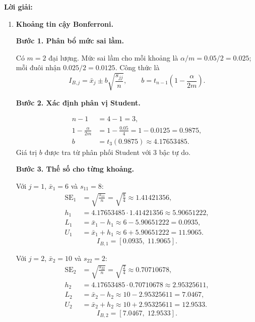\documentclass[11pt,a4paper]{article}
\newenvironment{solution}{%
  \par\medskip\noindent\textbf{Lời giải:}\par\nobreak\smallskip\noindent\ignorespaces
}{\par}
\newcommand{\answer}[1]{\boxed{#1}}
\newcommand{\step}[2]{\par\medskip\noindent\textbf{Bước #1. #2}\par\nopagebreak[4]\smallskip\noindent}
\begin{document}
\begin{solution}
\begin{enumerate}[label=\textbf{\alph*)}]
Các khoảng chiếu có mức bao phủ đồng thời ít nhất $95\%$ dưới giả thiết mẫu chuẩn.
\item \textbf{Khoảng tin cậy Bonferroni.}\par\nopagebreak[4]
\step{1}{Phân bổ mức sai lầm.}
Có $m=2$ đại lượng. Mức sai lầm cho mỗi khoảng là
$\alpha/m=0.05/2=0.025$; mỗi đuôi nhận $0.025/2=0.0125$.
Công thức là
\[
I_{B,j}=\bar{x}_j\pm b\sqrt{\frac{s_{jj}}n},\qquad
b=t_{n-1}\left(1-\frac{\alpha}{2m}\right).
\]
\step{2}{Xác định phân vị Student.}
\begin{align*}
n-1&=4-1=3,\\
1-\frac{\alpha}{2m}&=1-\frac{0.05}{4}=1-0.0125=0.9875,\\
b&=t_3(0.9875)\approx4.17653485.
\end{align*}
Giá trị $b$ được tra từ phân phối Student với 3 bậc tự do.
\step{3}{Thế số cho từng khoảng.}
\begin{samepage}
Với $j=1$, $\bar{x}_1=6$ và $s_{11}=8$:
\begin{align*}
\operatorname{SE}_{1}&=\sqrt{\frac{s_{11}}{n}}
=\sqrt{\frac{8}{4}}\approx1.41421356,\\
h_{1}&=4.17653485\cdot1.41421356\approx5.90651222,\\
L_{1}&=\bar{x}_{1}-h_{1}
\approx 6-5.90651222=0.0935,\\
U_{1}&=\bar{x}_{1}+h_{1}
\approx 6+5.90651222=11.9065.
\end{align*}
\[
\answer{I_{B,1}=[0.0935,\;11.9065]}.
\]
\end{samepage}

\begin{samepage}
Với $j=2$, $\bar{x}_2=10$ và $s_{22}=2$:
\begin{align*}
\operatorname{SE}_{2}&=\sqrt{\frac{s_{22}}{n}}
=\sqrt{\frac{2}{4}}\approx0.70710678,\\
h_{2}&=4.17653485\cdot0.70710678\approx2.95325611,\\
L_{2}&=\bar{x}_{2}-h_{2}
\approx 10-2.95325611=7.0467,\\
U_{2}&=\bar{x}_{2}+h_{2}
\approx 10+2.95325611=12.9533.
\end{align*}
\[
\answer{I_{B,2}=[7.0467,\;12.9533]}.
\]
\end{samepage}


\end{enumerate}
\end{solution}
\end{document}

